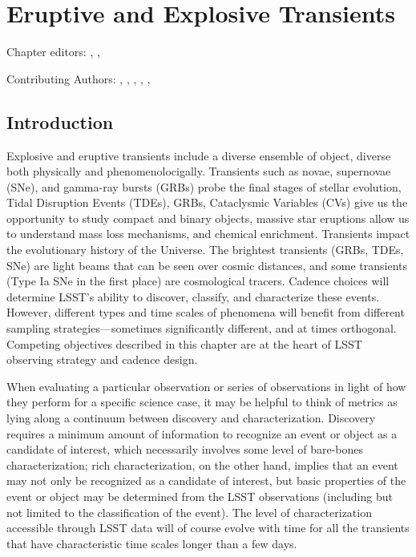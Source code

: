 
\chapter[Eruptive and Explosive Transients]{Eruptive and Explosive Transients}
\def\chpname{transients}\label{chp:\chpname}


Chapter editors:
,
,

Contributing Authors:
,
,
,
,
,


\section{Introduction}


Explosive and eruptive transients include a diverse ensemble of
object, diverse both physically and phenomenolocigally. Transients
such as novae, supernovae (SNe), and gamma-ray bursts (GRBs) probe the
final stages of stellar evolution, Tidal Disruption Events (TDEs), GRBs, Cataclysmic Variables (CVs) give us the
opportunity to study compact and binary objects, massive star
eruptions allow us to understand mass loss mechanisms, and chemical
enrichment. Transients impact the evolutionary history of the
Universe. The brightest transients (GRBs, TDEs, SNe) are light beams
that can be seen over cosmic distances, and some transients (Type Ia
SNe in the first place) are cosmological tracers.  Cadence choices
will determine LSST's ability to discover, classify, and characterize
these events. However, different types and time scales of phenomena
will benefit from different sampling strategies---sometimes
significantly different, and at times orthogonal.  Competing
objectives described in this chapter are at the heart of LSST
observing strategy and cadence design.

When evaluating a particular observation or series of observations in
light of how they perform for a specific science case, it may be
helpful to think of metrics as lying along a continuum between
discovery and characterization. Discovery requires a minimum amount of
information to recognize an event or object as a candidate of
interest, which necessarily involves some level of bare-bones
characterization; rich characterization, on the other hand, implies
that an event may not only be recognized as a candidate of interest,
but basic properties of the event or object may be determined from the
LSST observations (including but not limited to the classification of
the event). The level of characterization accessible through LSST data
will of course evolve with time for all the transients that have
characteristic time scales longer than a few days.

